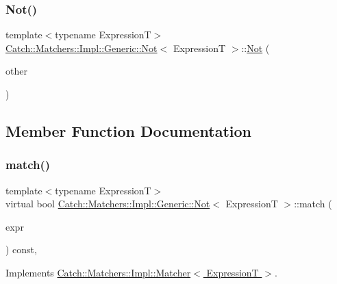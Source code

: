 \subsubsection{\texorpdfstring{Not()}{Not()}\hspace{0.1cm}{\footnotesize\ttfamily [2/2]}}
{\footnotesize\ttfamily template$<$typename ExpressionT$>$ \\
\hyperlink{class_catch_1_1_matchers_1_1_impl_1_1_generic_1_1_not}{Catch\+::\+Matchers\+::\+Impl\+::\+Generic\+::\+Not}$<$ ExpressionT $>$\+::\hyperlink{class_catch_1_1_matchers_1_1_impl_1_1_generic_1_1_not}{Not} (\begin{DoxyParamCaption}\item[{\hyperlink{class_catch_1_1_matchers_1_1_impl_1_1_generic_1_1_not}{Not}$<$ ExpressionT $>$ const \&}]{other }\end{DoxyParamCaption})\hspace{0.3cm}{\ttfamily [inline]}}



\subsection{Member Function Documentation}
\hypertarget{class_catch_1_1_matchers_1_1_impl_1_1_generic_1_1_not_a18c49fc6fb73a42d54650dafc18c7db1}{}\label{class_catch_1_1_matchers_1_1_impl_1_1_generic_1_1_not_a18c49fc6fb73a42d54650dafc18c7db1} 
\subsubsection{\texorpdfstring{match()}{match()}}
{\footnotesize\ttfamily template$<$typename ExpressionT$>$ \\
virtual bool \hyperlink{class_catch_1_1_matchers_1_1_impl_1_1_generic_1_1_not}{Catch\+::\+Matchers\+::\+Impl\+::\+Generic\+::\+Not}$<$ ExpressionT $>$\+::match (\begin{DoxyParamCaption}\item[{ExpressionT const \&}]{expr }\end{DoxyParamCaption}) const\hspace{0.3cm}{\ttfamily [inline]}, {\ttfamily [virtual]}}



Implements \hyperlink{struct_catch_1_1_matchers_1_1_impl_1_1_matcher_a8c1c5511ce1f3738a45e6901b558f583}{Catch\+::\+Matchers\+::\+Impl\+::\+Matcher$<$ Expression\+T $>$}.

